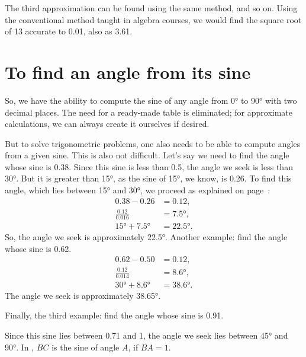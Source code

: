The third approximation can be found using the same method, and so on. Using the conventional method taught in algebra courses, we would find the square root of 13 accurate to 0.01, also as 3.61.


\section{To find an angle from its sine}
\label{sec-5.3}

So, we have the ability to compute the sine of any angle from \ang{0} to \ang{90} with two decimal places. The need for a ready-made table is eliminated; for approximate calculations, we can always create it ourselves if desired.

But to solve trigonometric problems, one also needs to be able to compute angles from a given sine. This is also not difficult. Let's say we need to find the angle whose sine is 0.38. Since this sine is less than 0.5, the angle we seek is less than \ang{30}. But it is greater than \ang{15}, as the sine of \ang{15}, we know, is 0.26. To find this angle, which lies between \ang{15} and \ang{30}, we proceed as explained on page~\pageref{page-130}:
\begin{align*}%
0.38 - 0.26 & = 0.12,\\
\frac{0.12}{0.016} & = \ang{7.5},\\
\ang{15}  + \ang{7.5} & = \ang{22.5}.
\end{align*}
So, the angle we seek is approximately \ang{22.5}. Another example: find the angle whose sine is 0.62.
\begin{align*}%
0.62 - 0.50 & = 0.12,\\
\frac{0.12}{0.014} & = \ang{8.6},\\
\ang{30}  + \ang{8.6} & = \ang{38.6}.
\end{align*}
The angle we seek is approximately \ang{38.65}.

Finally, the third example: find the angle whose sine is 0.91.

Since this sine lies between 0.71 and 1, the angle we seek lies between \ang{45} and \ang{90}. In , $BC$ is the sine of angle $A$, if $BA = 1$.

